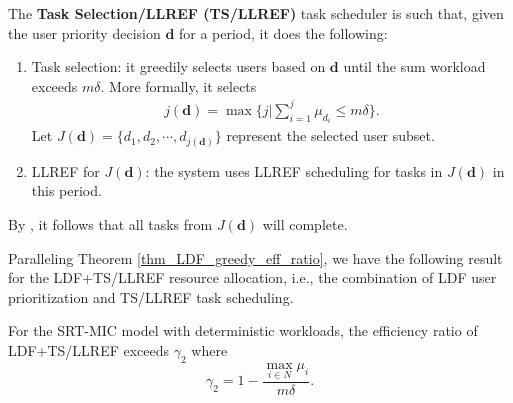 \documentclass[prodmode,acmtompecs]{acmsmall}
\newcommand{\fullUserSet}{N}
\newcommand{\myComments}[1]{}
\newif\ifdissertation
\newcommand{\dissertationStart}{\ifdissertation  \myComments{Dissertation version: }}
\newcommand{\commentEnd}{\myComments{End}}
\begin{document}
\dissertationStart
Now we propose the following task scheduler. The framework is exhibited in Figure~{\ref{fig_LDF_TS_LLREF_framework}}. 
\commentEnd\fi

\begin{definition}
\label{defn_TS_LLREF}
The {\bf Task Selection/LLREF (TS/LLREF)} task scheduler is such that, given the user priority decision $\mathbf{d}$ for a period, it does the following: 
\begin{enumerate}
\item Task selection: it greedily selects users based on $\mathbf{d}$ until the sum workload exceeds $m\delta$. More formally, it selects
\begin{align}
\label{align_j_d}
j(\mathbf{d}) = \max\Big\{j | \sum\limits_{i = 1}^{j} \mu_{d_i} \leq m\delta \Big\}. 
\end{align}
Let $J(\mathbf{d}) = \{d_1, d_2, \cdots, d_{j(\mathbf{d})}\}$ represent the selected user subset. 
\dissertationStart
subset\footnote{One trivial way to extend the task selection step is to continue checking users greedily according to $\mathbf{d}$ and adding users to $J(\mathbf{d})$ while guaranteeing $\sum\limits_{i\in J(\mathbf{d})} \mu_i \leq m\delta$. But that does not improve the results in the sequel and therefore, we do not discuss this extension. }. 
\commentEnd\fi
\item LLREF for $J(\mathbf{d})$: the system uses LLREF scheduling for tasks in $J(\mathbf{d})$ in this period. 
\end{enumerate}
\end{definition}
By \cite{CRJ06A}, it follows that all tasks from $J(\mathbf{d})$ will complete. 

\dissertationStart
\begin{figure}[htp]
  \centering
  \texttt{[image: Figures/framework\_LDF\_TS\_LLREF.pdf]}
  \caption{The framework for LDF+TS/LLREF design. }
  \label{fig_LDF_TS_LLREF_framework}
\end{figure}
\commentEnd\fi

Paralleling Theorem \ref{thm_LDF_greedy_eff_ratio}, we have the following result for the LDF+TS/LLREF resource allocation, i.e., the combination of LDF user prioritization and TS/LLREF task scheduling. 
\dissertationStart
The framework of LDF+TS/LLREF is exhibited in Figure{~\ref{fig_LDF_TS_LLREF_framework}}. 
\commentEnd\fi

\begin{theorem}
\label{thm_LDF_TS_LLREF_eff_ratio}
For the SRT-MIC model with deterministic workloads, the efficiency ratio of LDF+TS/LLREF exceeds $\gamma_2$ where
$$
\gamma_2 = 1 - \frac{\max\limits_{i \in \fullUserSet} \mu_i}{m\delta}. 
$$
\end{theorem}
\end{document}
